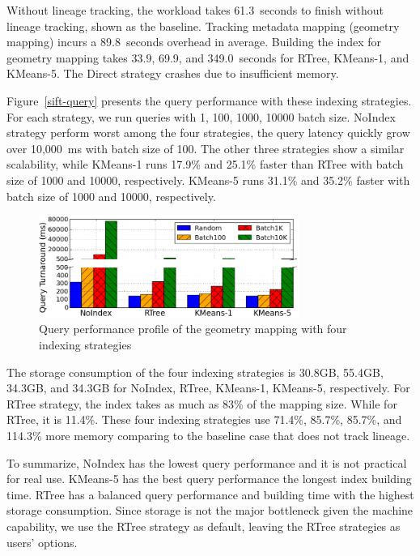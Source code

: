 \documentclass{sig-alternate}
\begin{document}
Without lineage tracking, the workload takes 61.3~seconds to finish without lineage tracking, shown as the baseline.
Tracking metadata mapping (geometry mapping) incurs a 89.8~seconds overhead in average. 
Building the index for geometry mapping takes 33.9, 69.9, and 349.0~seconds for RTree, KMeans-1, and KMeans-5.
The Direct strategy crashes due to insufficient memory.

Figure~\ref{sift-query} presents the query performance with these indexing strategies.
For each strategy, we run queries with {1, 100, 1000, 10000} batch size.
NoIndex strategy perform worst among the four strategies, the query latency quickly grow over 10,000~ms with batch size of 100.
The other three strategies show a similar scalability, while KMeans-1 runs 17.9\% and 25.1\% faster than RTree with batch size of 1000 and 10000, respectively.
KMeans-5 runs  31.1\% and 35.2\% faster with batch size of 1000 and 10000, respectively.


\begin{figure}[h]
\begin{center}
    \includegraphics[width=85mm]{pictures/SIFTQuery-Time}
\caption {Query performance profile of the geometry mapping with four indexing strategies
    \label{fig:sift-query}
}
\end{center}
\end{figure}

The storage consumption of the four indexing strategies is 30.8GB, 55.4GB, 34.3GB, and 34.3GB 
for NoIndex, RTree, KMeans-1, KMeans-5, respectively. 
For RTree strategy, the index takes as much as 83\% of the mapping size. 
While for RTree, it is 11.4\%.
These four indexing strategies use 71.4\%, 85.7\%, 85.7\%, and 114.3\% more memory comparing to the
baseline case that does not track lineage.

To summarize, NoIndex has the lowest query performance and it is not practical for real use.
KMeans-5 has the best query performance the longest index building time.
RTree has a balanced query performance and building time with the highest storage consumption.
Since storage is not the major bottleneck given the machine capability, we use the RTree strategy
as default, leaving the RTree strategies as users' options.
\end{document}
